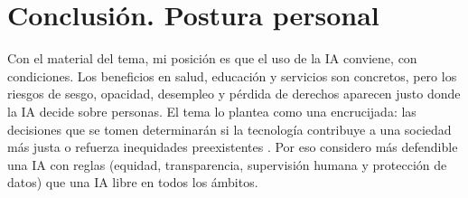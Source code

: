 \documentclass[11pt,letterpaper]{article}
\begin{document}
\section{Conclusión. Postura personal}

Con el material del tema, mi posición es que el uso de la IA conviene, con condiciones. Los beneficios en salud, educación y servicios son concretos, pero los riesgos de sesgo, opacidad, desempleo y pérdida de derechos aparecen justo donde la IA decide sobre personas. El tema lo plantea como una encrucijada: las decisiones que se tomen determinarán si la tecnología contribuye a una sociedad más justa o refuerza inequidades preexistentes \parencite{iae_u6_t62}. Por eso considero más defendible una IA con reglas (equidad, transparencia, supervisión humana y protección de datos) que una IA libre en todos los ámbitos.

\end{document}
